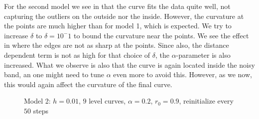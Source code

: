 For the second model we see in  that the curve fits the data quite well, not capturing the outliers on the outside nor the inside. However, the curvature at the points are much higher than for model 1, which is expected. We try to increase $\delta$ to $\delta=10^-1$ to bound the curvature near the points. We see the effect in  where the edges are not as sharp at the points. Since also, the distance dependent term is not as high for that choice of $\delta$, the $\alpha$-parameter is also increased. What we observe is also that the curve is again located inside the noisy band, an one might need to tune $\alpha$ even more to avoid this. However, as we now, this would again affect the curvature of the final curve. 

\begin{figure}
\begin{center}
\end{center}
\vspace{-2.5em}
\caption[Model 2 - Noisy point set, $\alpha=0.2$]{Model 2: $h=0.01$, $9$ level curves, $\alpha=0.2$, $r_0=0.9$, reinitialize every $50$ steps}
\label{fig:m2-noisypoints-a02}
\end{figure}

